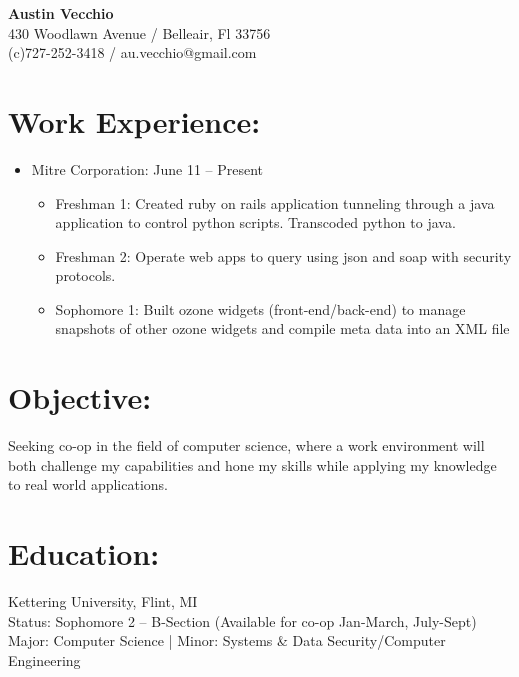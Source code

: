 \documentclass{res}
\begin{document}
\begin{center}
\LARGE{\textbf{Austin Vecchio}}\\
\normalsize{
430 Woodlawn Avenue / Belleair, Fl 33756\\
(c)727-252-3418 / au.vecchio@gmail.com
}
\end{center}

\section{Work Experience:}
\begin{itemize}
\item Mitre Corporation: \hspace{45pt} June 11 – Present
\begin{itemize}[label=$\circ$]
\item Freshman 1: Created ruby on rails application tunneling through a java application to control python scripts. Transcoded python to java.
\item Freshman 2: Operate web apps to query using json and soap with security protocols.
\item Sophomore 1: Built ozone widgets (front-end/back-end) to manage snapshots of other ozone widgets and compile meta data into an XML file
\end{itemize}
\end{itemize}

\section{Objective:}
Seeking co-op in the field of computer science, where a work environment will both challenge my capabilities and hone my skills while applying my knowledge to real world applications.\\

\section{Education:}
Kettering University, Flint, MI\\
Status: Sophomore 2 – B-Section (Available for co-op Jan-March, July-Sept)\\
Major: Computer Science   |   Minor: Systems \& Data Security/Computer Engineering
\end{document}
